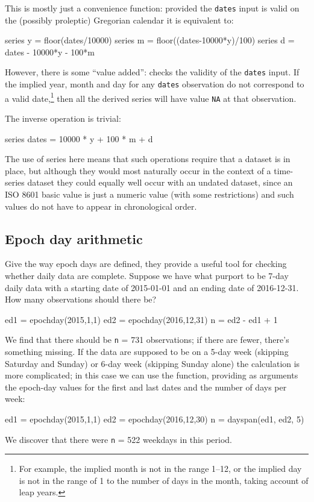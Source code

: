 This is mostly just a convenience function: provided the
\texttt{dates} input is valid on the (possibly proleptic) Gregorian
calendar it is equivalent to:
%
\begin{code}
series y = floor(dates/10000)
series m = floor((dates-10000*y)/100)
series d = dates - 10000*y - 100*m
\end{code}

However, there is some ``value added'':  checks the
validity of the \texttt{dates} input. If the implied year, month and
day for any \texttt{dates} observation do not correspond to a valid
date,\footnote{For example, the implied month is not in the range
  1--12, or the implied day is not in the range of 1 to the number of
  days in the month, taking account of leap years.} then all the
derived series will have value \texttt{NA} at that observation.

The inverse operation is trivial:
\begin{code}
series dates = 10000 * y + 100 * m + d
\end{code}

The use of series here means that such operations require that a
dataset is in place, but although they would most naturally occur in
the context of a time-series dataset they could equally well occur
with an undated dataset, since an ISO 8601 basic value is just a
numeric value (with some restrictions) and such values do not have to
appear in chronological order.

\subsection{Epoch day arithmetic}

Give the way epoch days are defined, they provide a useful tool for
checking whether daily data are complete. Suppose we have what purport
to be 7-day daily data with a starting date of 2015-01-01 and an
ending date of 2016-12-31. How many observations should there be?
%
\begin{code}
ed1 = epochday(2015,1,1)
ed2 = epochday(2016,12,31)
n = ed2 - ed1 + 1
\end{code}
We find that there should be \texttt{n} = 731 observations; if there
are fewer, there's something missing. If the data are supposed to be
on a 5-day week (skipping Saturday and Sunday) or 6-day week (skipping
Sunday alone) the calculation is more complicated; in this case we can
use the  function, providing as arguments the
epoch-day values for the first and last dates and the number of days
per week:
\begin{code}
ed1 = epochday(2015,1,1)
ed2 = epochday(2016,12,30)
n = dayspan(ed1, ed2, 5)
\end{code}
%
We discover that there were \texttt{n} = 522 weekdays in this period.

